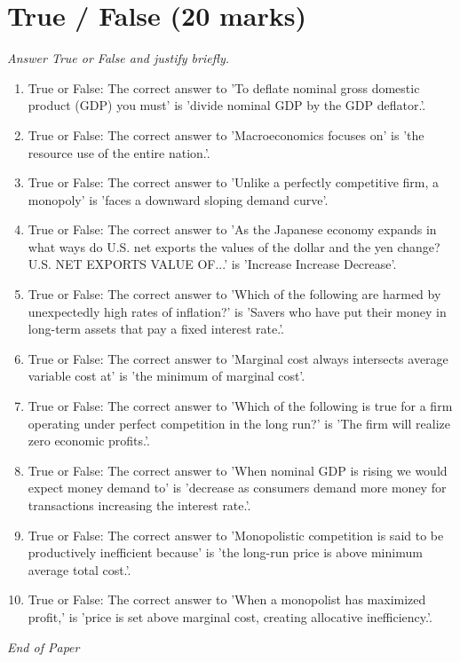\documentclass[12pt]{article}
\begin{document}
\section*{True / False (20 marks)}
\textit{Answer True or False and justify briefly.}
\begin{enumerate}[label=\arabic*.]
\item True or False: The correct answer to 'To deflate nominal gross domestic product (GDP) you must' is 'divide nominal GDP by the GDP deflator.'.
\item True or False: The correct answer to 'Macroeconomics focuses on' is 'the resource use of the entire nation.'.
\item True or False: The correct answer to 'Unlike a perfectly competitive firm, a monopoly' is 'faces a downward sloping demand curve'.
\item True or False: The correct answer to 'As the Japanese economy expands in what ways do U.S. net exports the values of the dollar and the yen change? U.S. NET EXPORTS VALUE OF...' is 'Increase Increase Decrease'.
\item True or False: The correct answer to 'Which of the following are harmed by unexpectedly high rates of inflation?' is 'Savers who have put their money in long-term assets that pay a fixed interest rate.'.
\item True or False: The correct answer to 'Marginal cost always intersects average variable cost at' is 'the minimum of marginal cost'.
\item True or False: The correct answer to 'Which of the following is true for a firm operating under perfect competition in the long run?' is 'The firm will realize zero economic profits.'.
\item True or False: The correct answer to 'When nominal GDP is rising we would expect money demand to' is 'decrease as consumers demand more money for transactions increasing the interest rate.'.
\item True or False: The correct answer to 'Monopolistic competition is said to be productively inefficient because' is 'the long-run price is above minimum average total cost.'.
\item True or False: The correct answer to 'When a monopolist has maximized profit,' is 'price is set above marginal cost, creating allocative inefficiency.'.
\end{enumerate}

\vfill
\noindent\textit{End of Paper}
\end{document}
